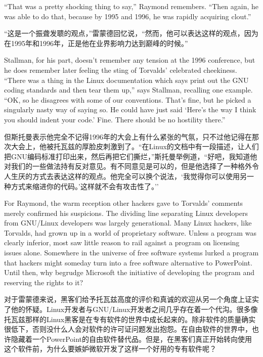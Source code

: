 \ifdefined\eng
``That was a pretty shocking thing to say,'' Raymond remembers. ``Then again, he was able to do that, because by 1995 and 1996, he was rapidly acquiring clout.''
\fi

\ifdefined\chs
``这是一个振聋发聩的观点，''雷蒙德回忆说，``然而，他可以表达这样的观点，因为在1995年和1996年，正是他在业界影响力达到巅峰的时候。''
\fi

\ifdefined\eng
Stallman, for his part, doesn't remember any tension at the 1996 conference, but he does remember later feeling the sting of Torvalds' celebrated cheekiness. ``There was a thing in the Linux documentation which says print out the GNU coding standards and then tear them up,'' says Stallman, recalling one example. ``OK, so he disagrees with some of our conventions. That's fine, but he picked a singularly nasty way of saying so. He could have just said `Here's the way I think you should indent your code.' Fine. There should be no hostility there.''
\fi

\ifdefined\chs
但斯托曼表示他完全不记得1996年的大会上有什么紧张的气氛，只不过他记得在那次大会上，他被托瓦兹的厚脸皮刺激到了。``在Linux的文档中有一段描述，让人们把GNU编码标准打印出来，然后再把它们撕烂，''斯托曼举例道，``好吧，我知道他对我们的一些做法持有反对意见。有不同意见是可以的，但是他选择了一种格外令人生厌的方式去表达这样的观点。他完全可以换个说法，`我觉得你可以使用另一种方式来缩进你的代码。'这样就不会有攻击性了。''
\fi

\ifdefined\eng
For Raymond, the warm reception other hackers gave to Torvalds' comments merely confirmed his suspicions. The dividing line separating Linux developers from GNU/Linux developers was largely generational. Many Linux hackers, like Torvalds, had grown up in a world of proprietary software. Unless a program was clearly inferior, most saw little reason to rail against a program on licensing issues alone. Somewhere in the universe of free software systems lurked a program that hackers might someday turn into a free software alternative to PowerPoint. Until then, why begrudge Microsoft the initiative of developing the program and reserving the rights to it?
\fi

\ifdefined\chs
对于雷蒙德来说，黑客们给予托瓦兹高度的评价和真诚的欢迎从另一个角度上证实了他的怀疑。Linux开发者与GNU/Linux开发者之间几乎存在着一个代沟。很多像托瓦兹那样的Linux黑客是在专有软件的世界中成长起来的。除非软件的质量确实很低下，否则没什么人会对软件的许可证问题发出抱怨。在自由软件的世界中，也许隐藏着一个PowerPoint的自由软件替代品。但是，在黑客们真正开始转向使用这个软件前，为什么要嫉妒微软开发了这样一个好用的专有软件呢？
\fi

